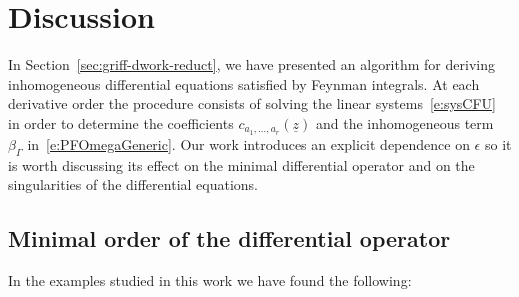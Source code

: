 \documentclass[a4paper,12pt]{article}
\numberwithin{equation}{section}
\numberwithin{figure}{section}
\begin{document}
\section{Discussion}
%
In Section~\ref{sec:griff-dwork-reduct}, we have presented an
algorithm for deriving inhomogeneous differential equations satisfied by Feynman
integrals. At each derivative order the
 procedure consists of solving the linear systems~\eqref{e:sysCFU} in order to
determine the coefficients $c_{a_1,\dots,a_r}(\underline z)$ and the 
inhomogeneous term $\beta_\Gamma$ in~\eqref{e:PFOmegaGeneric}. Our work introduces an explicit dependence on $\epsilon$ so it is worth discussing  its effect on the minimal differential
operator and on the singularities of the differential equations.
%
%

\subsection{Minimal order of the differential operator}
\label{sec:minim-order-diff}

In the examples studied in this work we have found the following:
\end{document}
